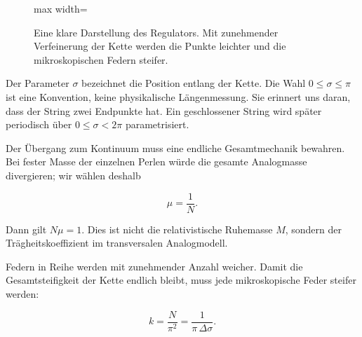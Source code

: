 \begin{figure}[H]
  \centering
  \begin{adjustbox}{max width=\linewidth}
  \end{adjustbox}
  \caption{Eine klare Darstellung des Regulators. Mit zunehmender Verfeinerung der Kette werden die Punkte leichter und die mikroskopischen Federn steifer.}
  \label{fig:l02-chain-redraw}
\end{figure}

Der Parameter \(\sigma\) bezeichnet die Position entlang der Kette. Die Wahl \(0\leq\sigma\leq\pi\) ist eine Konvention, keine physikalische Längenmessung. Sie erinnert uns daran, dass der String zwei Endpunkte hat. Ein geschlossener String wird später periodisch über \(0\leq\sigma<2\pi\) parametrisiert.

Der Übergang zum Kontinuum muss eine endliche Gesamtmechanik bewahren. Bei fester Masse der einzelnen Perlen würde die gesamte Analogmasse divergieren; wir wählen deshalb

\begin{equation}
  \mu=\frac{1}{N}.
  \label{eq:l02-mu-scaling}
\end{equation}

Dann gilt \(N\mu=1\). Dies ist nicht die relativistische Ruhemasse \(M\), sondern der Trägheitskoeffizient im transversalen Analogmodell.

Federn in Reihe werden mit zunehmender Anzahl weicher. Damit die Gesamtsteifigkeit der Kette endlich bleibt, muss jede mikroskopische Feder steifer werden:

\begin{equation}
  k=\frac{N}{\pi^2}
  =\frac{1}{\pi\,\Delta\sigma}.
  \label{eq:l02-k-scaling}
\end{equation}

